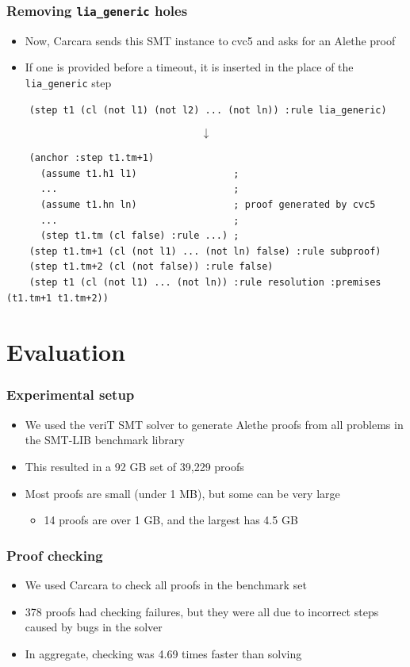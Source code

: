 \documentclass[usepdftitle=false,aspectratio=169]{beamer}
\newcommand\vitem{\vfill\item}
\begin{document}
\begin{frame}[fragile]
  \frametitle{Removing \texttt{lia\_generic} holes}
  \begin{itemize}
    \item Now, Carcara sends this SMT instance to cvc5 and asks for an Alethe
    proof
    \vitem If one is provided before a timeout, it is inserted in the place of
    the \texttt{lia\_generic} step
  \end{itemize}
  \vfill
  \begin{verbatim}
    (step t1 (cl (not l1) (not l2) ... (not ln)) :rule lia_generic)
  \end{verbatim}
  $$\downarrow$$
  \begin{verbatim}
    (anchor :step t1.tm+1)
      (assume t1.h1 l1)                 ;
      ...                               ;
      (assume t1.hn ln)                 ; proof generated by cvc5
      ...                               ;
      (step t1.tm (cl false) :rule ...) ;
    (step t1.tm+1 (cl (not l1) ... (not ln) false) :rule subproof)
    (step t1.tm+2 (cl (not false)) :rule false)
    (step t1 (cl (not l1) ... (not ln)) :rule resolution :premises (t1.tm+1 t1.tm+2))
  \end{verbatim}
\end{frame}

\section{Evaluation}

\begin{frame}
  \frametitle{Experimental setup}
  \begin{itemize}
    \item We used the veriT SMT solver to generate Alethe proofs from all
    problems in the SMT-LIB benchmark library
    \vitem This resulted in a 92 GB set of 39,229 proofs
    \vitem Most proofs are small (under 1 MB), but some can be very large
    \begin{itemize}
      \item 14 proofs are over 1 GB, and the largest has 4.5 GB
    \end{itemize}
  \end{itemize}
\end{frame}

\begin{frame}
  \frametitle{Proof checking}
  \begin{itemize}
    \item We used Carcara to check all proofs in the benchmark set
    \vitem 378 proofs had checking failures, but they were all due to incorrect
    steps caused by bugs in the solver
    \vitem In aggregate, checking was 4.69 times faster than solving
  \end{itemize}
\end{frame}
\end{document}
